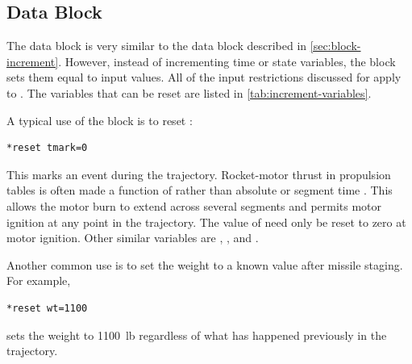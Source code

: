 \subsection{ Data Block}\label{sec:block-reset}

The  data block is very similar to the
 data block described in \cref{sec:block-increment}.
However, instead of incrementing time or state variables, the
 block sets them equal to input values. All of the input
restrictions discussed for  apply to
. The variables that can be reset are listed in
\cref{tab:increment-variables}.

A typical use of the block is to reset :

\begin{lstlisting}[style=taosmanual]
*reset tmark=0
\end{lstlisting}

This marks an event during the trajectory. Rocket-motor thrust in propulsion tables
is often made a function of  rather than absolute
 or segment time . This allows the motor burn to
extend across several segments and permits motor ignition at any point in the
trajectory. The value of  need only be reset to zero at motor
ignition. Other similar variables are , , and
.

Another common use is to set the weight to a known value after missile staging. For
example,

\begin{lstlisting}[style=taosmanual]
*reset wt=1100
\end{lstlisting}

sets the weight to 1100~lb regardless of what has happened previously in the
trajectory.
